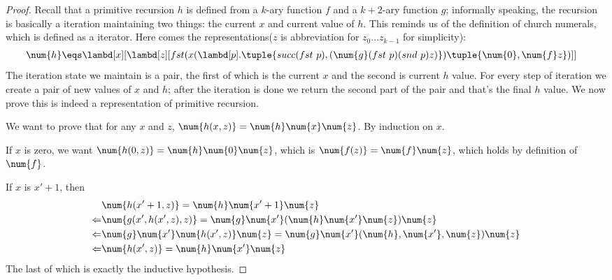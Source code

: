 \documentclass[../../../include/open-logic-section]{subfiles}
\begin{document}
\begin{proof}
  Recall that a primitive recursion $h$ is defined from a $k$-ary function $f$ and a $k+2$-ary function
  $g$; informally speaking, the recursion is basically a iteration
  maintaining two things: the current $x$ and current value of $h$. This
  reminds us of the definition of church numerals, which is defined as a
  iterator. Here comes the representations($z$ is abbreviation for $z_0
  \dots z_{k-1}$ for simplicity):
  \begin{align*}
    \num{h} &\eqs \lambd[x][\lambd[z][fst (x (\lambd[p].\tuple{succ (fst ~ p),
              (\num{g} (fst ~ p) (snd ~ p) z)}) \tuple{\num{0}, \num{f} z})]]
  \end{align*}
  The iteration state we maintain is a pair, the first of which is the
  current $x$ and the second is current $h$ value. For every step of
  iteration we create a pair of new values of $x$ and $h$; after the
  iteration is done we return the second part of the pair and that's the
  final $h$ value. We now prove this is indeed a representation of
  primitive recursion.

  We want to prove that for any $x$ and $z$, $\num{h(x,z)} = \num{h}
  \num{x} \num{z}$. By induction on $x$.

  If $x$ is zero, we want $\num{h(0,z)} = \num{h} \num{0} \num{z}$,
  which is $\num{f(z)} = \num{f} \num{z}$, which holds by definition
  of $\num{f}$.
  
  If $x$ is $x'+1$, then
  \begin{align*}
    &\num{h(x'+1,z)} = \num{h} \num{x'+1} \num{z} \\
    \Leftarrow & \num{g(x',h(x',z),z)} = \num{g} \num{x'} (\num{h}
                 \num{x'} \num{z}) \num{z} \\
    \Leftarrow & \num{g} \num{x'} \num{h(x',z)} \num{z} = \num{g}
                 \num{x'} (\num{h}, \num{x'}, \num{z}) \num{z} \\
    \Leftarrow & \num{h(x',z)} = \num{h} \num{x'} \num{z}
  \end{align*}
  The last of which is exactly the inductive hypothesis.
\end{proof}
\end{document}
